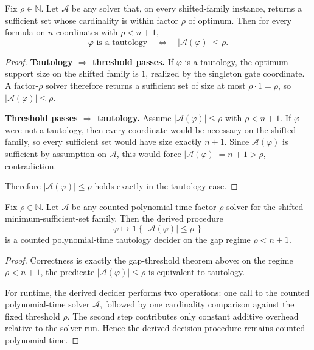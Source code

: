 \begin{theorem}
Fix $\rho\in\mathbb{N}$. Let $\mathcal{A}$ be any solver that, on every shifted-family instance, returns a sufficient set whose cardinality is within factor $\rho$ of optimum. Then for every formula on $n$ coordinates with $\rho<n+1$,
\[
\varphi \text{ is a tautology}
\quad\Longleftrightarrow\quad
|\mathcal{A}(\varphi)|\le \rho.
\]
\end{theorem}


\begin{proof}
\textbf{Tautology $\Rightarrow$ threshold passes.}
If $\varphi$ is a tautology, the optimum support size on the shifted family is $1$, realized by the singleton gate coordinate. A factor-$\rho$ solver therefore returns a sufficient set of size at most $\rho\cdot 1=\rho$, so $|\mathcal{A}(\varphi)|\le \rho$.

\textbf{Threshold passes $\Rightarrow$ tautology.}
Assume $|\mathcal{A}(\varphi)|\le \rho$ with $\rho<n+1$. If $\varphi$ were not a tautology, then every coordinate would be necessary on the shifted family, so every sufficient set would have size exactly $n+1$. Since $\mathcal{A}(\varphi)$ is sufficient by assumption on $\mathcal{A}$, this would force $|\mathcal{A}(\varphi)|=n+1>\rho$, contradiction.

Therefore $|\mathcal{A}(\varphi)|\le \rho$ holds exactly in the tautology case.
\end{proof}

\begin{theorem}
Fix $\rho\in\mathbb{N}$. Let $\mathcal{A}$ be any counted polynomial-time factor-$\rho$ solver for the shifted minimum-sufficient-set family. Then the derived procedure
\[
\varphi \longmapsto \mathbf{1}\!\left\{\,|\mathcal{A}(\varphi)|\le \rho\,\right\}
\]
is a counted polynomial-time tautology decider on the gap regime $\rho<n+1$.
\end{theorem}


\begin{proof}
Correctness is exactly the gap-threshold theorem above: on the regime $\rho<n+1$, the predicate $|\mathcal{A}(\varphi)|\le \rho$ is equivalent to tautology.

For runtime, the derived decider performs two operations: one call to the counted polynomial-time solver $\mathcal{A}$, followed by one cardinality comparison against the fixed threshold $\rho$. The second step contributes only constant additive overhead relative to the solver run. Hence the derived decision procedure remains counted polynomial-time.
\end{proof}

